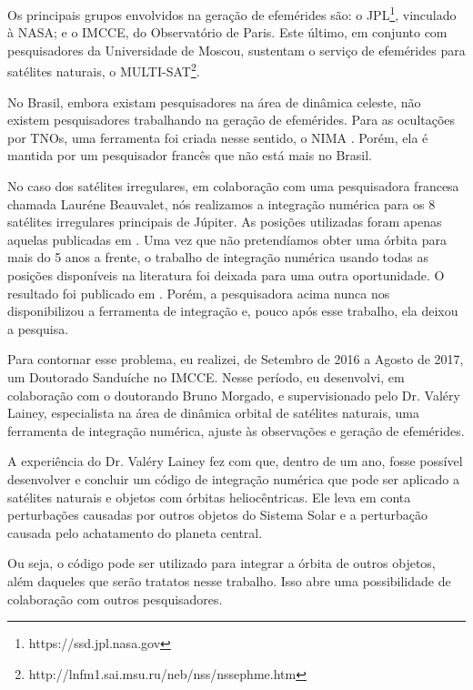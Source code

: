\documentclass[12pt,a4paper]{report}
\begin{document}
Os principais grupos envolvidos na geração de efemérides são: o JPL\footnote{https://ssd.jpl.nasa.gov}, vinculado à NASA; e o IMCCE, do Observatório de Paris. Este último, em conjunto com pesquisadores da Universidade de Moscou, sustentam o serviço de efemérides para satélites naturais, o MULTI-SAT\footnote{http://lnfm1.sai.msu.ru/neb/nss/nssephme.htm}.

No Brasil, embora existam pesquisadores na área de dinâmica celeste, não existem pesquisadores trabalhando na geração de efemérides. Para as ocultações por TNOs, uma ferramenta foi criada nesse sentido, o NIMA \citep{Desmars2015}. Porém, ela é mantida por um pesquisador francês que não está mais no Brasil.

No caso dos satélites irregulares, em colaboração com uma pesquisadora francesa chamada Lauréne Beauvalet, nós realizamos a integração numérica para os 8 satélites irregulares principais de Júpiter. As posições utilizadas foram apenas aquelas publicadas em \cite{GomesJunior2015-Irregular}. Uma vez que não pretendíamos obter uma órbita para mais do 5 anos a frente, o trabalho de integração numérica usando todas as posições disponíveis na literatura foi deixada para uma outra oportunidade. O resultado foi publicado em \cite{GomesJunior2016}. Porém, a pesquisadora acima nunca nos disponibilizou a ferramenta de integração e, pouco após esse trabalho, ela deixou a pesquisa.

Para contornar esse problema, eu realizei, de Setembro de 2016 a Agosto de 2017, um Doutorado Sanduíche no IMCCE. Nesse período, eu desenvolvi, em colaboração com o doutorando Bruno Morgado, e supervisionado pelo Dr. Valéry Lainey, especialista na área de dinâmica orbital de satélites naturais, uma ferramenta de integração numérica, ajuste às observações e geração de efemérides.

A experiência do Dr. Valéry Lainey fez com que, dentro de um ano, fosse possível desenvolver e concluir um código de integração numérica que pode ser aplicado a satélites naturais e objetos com órbitas heliocêntricas. Ele leva em conta perturbações causadas por outros objetos do Sistema Solar e a perturbação causada pelo achatamento do planeta central.

Ou seja, o código pode ser utilizado para integrar a órbita de outros objetos, além daqueles que serão tratatos nesse trabalho. Isso abre uma possibilidade de colaboração com outros pesquisadores. 
\end{document}
